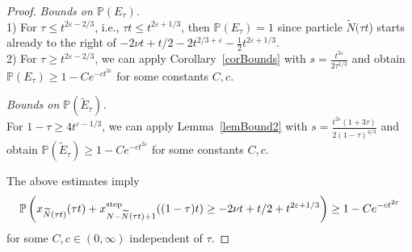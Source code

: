 \documentclass[12pt,a4paper]{article}
\numberwithin{equation}{section}
\newcommand{\Pb}{\mathbb{P}}
\newcommand{\e}{\varepsilon}
\begin{document}
\begin{proof}
\medskip
\noindent \emph{Bounds on $\Pb(E_\tau)$.}\\
1) For $\tau\leq t^{2\e-2/3}$, i.e., $\tau t\leq t^{2\e+1/3}$, then $\Pb(E_\tau)=1$ since particle $\widetilde N(\tau t$) starts already to the right of $-2\nu t+t/2-2 t^{2/3+\e}-\tfrac12 t^{2\e+1/3}$.\\
2) For $\tau\geq t^{2\e-2/3}$, we can apply Corollary~\ref{corBounds} with $s=\frac{t^{2\e}}{2\tau^{1/3}}$ and obtain $\Pb(E_\tau)\geq 1-C e^{-c t^{2\e}}$ for some constants $C,c$.

\medskip
\noindent \emph{Bounds on $\Pb(\widetilde E_\tau)$.}\\
For $1-\tau\geq 4t^{\e-1/3}$, we can apply Lemma~\ref{lemBound2} with $s=\frac{t^{2\e}(1+3\tau)}{2(1-\tau)^{4/3}}$ and obtain $\Pb(\widetilde E_\tau)\geq 1-C e^{-c t^{2\e}}$ for some constants $C,c$.

\medskip
The above estimates imply
\begin{equation}\label{eq3.28}
\Pb\left(x_{\widetilde N(\tau t)}(\tau t)+x^{\rm step}_{N-\widetilde N(\tau t)+1}((1-\tau) t)\geq -2\nu t+t/2+ t^{2\e+1/3}\right)\geq 1-C e^{-c t^{2\e}}
\end{equation}
for some $C,c\in (0,\infty)$ independent of $\tau$.


\end{proof}
\end{document}
